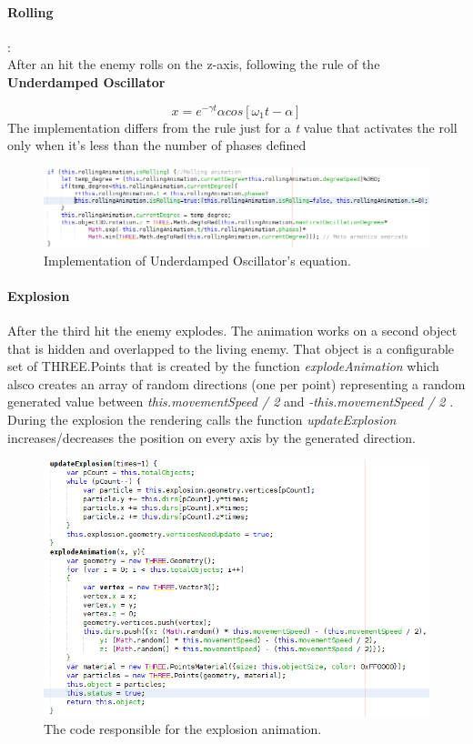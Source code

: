 \paragraph{Rolling}: \\
After an hit the enemy rolls on the z-axis, following the rule of the \textbf{Underdamped Oscillator}

\begin{equation}
x = e^{-\gamma t}\alpha cos[\omega_1t-\alpha]
\end{equation}
The implementation differs from the rule just for a \textit{t} value that activates the roll only when it's less than the number of phases defined
\begin{figure}[h!]
\begin{center}
\includegraphics[scale=0.4]{images/rolling.png}
\caption{Implementation of Underdamped Oscillator's equation.}
\end{center}
\end{figure}

\paragraph{Explosion}
After the third hit the enemy explodes. The animation works on a second object that is hidden and overlapped to the living enemy. That object is a configurable set of THREE.Points that is created by the function \textit{explodeAnimation} which alsco creates an array of random directions (one per point) representing a random generated value between \textit{this.movementSpeed / 2} and \textit{-this.movementSpeed / 2} . During the explosion the rendering calls the function \textit{updateExplosion} increases/decreases the position on every axis by the generated direction.
\begin{figure}[h!]
\begin{center}
\includegraphics[scale=0.4]{images/explosion.png}
\caption{The code responsible for the explosion animation.}
\end{center}
\end{figure}
\newline
